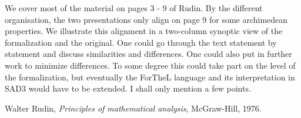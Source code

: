 \documentclass{article}
\begin{document}
We cover most of the material on pages 3 - 9 of Rudin. By the different organisation, the two presentations only align on page 9 for some archimedean properties. We illustrate this alignment in a two-column synoptic view of the formalization and the original. One could go through the text statement by statement and discuss similarities and differences. One could also put in further work to minimize differences. To some degree this could take part on the level of the formalization, but eventually the ForTheL language and its interpretation in SAD3 would have to be extended.
I shall only mention a few points.






\begin{thebibliography}{1}

  Walter Rudin,
  \textit{Principles of mathematical analysis},
  McGraw-Hill,
  1976.

\end{thebibliography}
  
\end{document}
